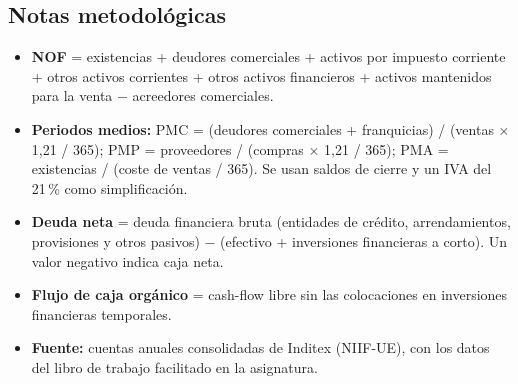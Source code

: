 \documentclass[11pt,a4paper]{article}
\newcommand{\mn}{\ensuremath{-}}                 %
\begin{document}
\subsection*{Notas metodológicas}
\begin{itemize}
  \item \textbf{NOF} = existencias + deudores comerciales + activos por impuesto corriente + otros activos
        corrientes + otros activos financieros + activos mantenidos para la venta \mn{} acreedores comerciales.
  \item \textbf{Periodos medios:} PMC = (deudores comerciales + franquicias) / (ventas × 1,21 / 365);
        PMP = proveedores / (compras × 1,21 / 365); PMA = existencias / (coste de ventas / 365).
        Se usan saldos de cierre y un IVA del 21\,\% como simplificación.
  \item \textbf{Deuda neta} = deuda financiera bruta (entidades de crédito, arrendamientos, provisiones y otros
        pasivos) \mn{} (efectivo + inversiones financieras a corto). Un valor negativo indica caja neta.
  \item \textbf{Flujo de caja orgánico} = cash-flow libre sin las colocaciones en inversiones financieras temporales.
  \item \textbf{Fuente:} cuentas anuales consolidadas de Inditex (NIIF-UE), con los datos del libro de trabajo
        facilitado en la asignatura.
\end{itemize}
\end{document}
